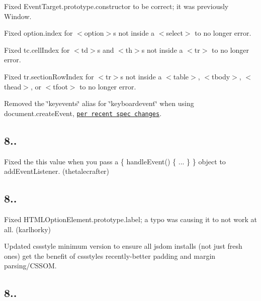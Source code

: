 \begin{DoxyItemize}
\item Fixed {\ttfamily Event\+Target.\+prototype.\+constructor} to be correct; it was previously {\ttfamily Window}.
\item Fixed {\ttfamily option.\+index} for {\ttfamily $<$option$>$}s not inside a {\ttfamily $<$select$>$} to no longer error.
\item Fixed {\ttfamily tc.\+cell\+Index} for {\ttfamily $<$td$>$}s and {\ttfamily $<$th$>$}s not inside a {\ttfamily $<$tr$>$} to no longer error.
\item Fixed {\ttfamily tr.\+section\+Row\+Index} for {\ttfamily $<$tr$>$}s not inside a {\ttfamily $<$table$>$}, {\ttfamily $<$tbody$>$}, {\ttfamily $<$thead$>$}, or {\ttfamily $<$tfoot$>$} to no longer error.
\item Removed the {\ttfamily \char`\"{}keyevents\char`\"{}} alias for {\ttfamily \char`\"{}keyboardevent\char`\"{}} when using {\ttfamily document.\+create\+Event}, \href{https://github.com/whatwg/dom/issues/148}{\tt per recent spec changes}.
\end{DoxyItemize}

\subsection*{8..}


\begin{DoxyItemize}
\item Fixed the {\ttfamily this} value when you pass a {\ttfamily \{ handle\+Event() \{ ... \} \}} object to {\ttfamily add\+Event\+Listener}. (thetalecrafter)
\end{DoxyItemize}

\subsection*{8..}


\begin{DoxyItemize}
\item Fixed {\ttfamily H\+T\+M\+L\+Option\+Element.\+prototype.\+label}; a typo was causing it to not work at all. (karlhorky)
\item Updated {\ttfamily cssstyle} minimum version to ensure all jsdom installs (not just fresh ones) get the benefit of {\ttfamily cssstyle}\textquotesingle{}s recently-\/better {\ttfamily padding} and {\ttfamily margin} parsing/\+C\+S\+S\+OM.
\end{DoxyItemize}

\subsection*{8..}


